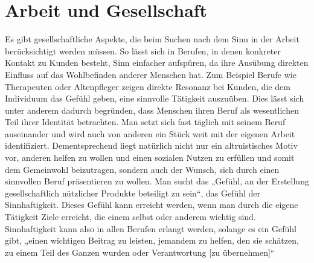 \section{Arbeit und Gesellschaft}
Es gibt gesellschaftliche Aspekte, die beim Suchen nach dem Sinn in der Arbeit berücksichtigt werden müssen. So lässt sich in Berufen, in denen konkreter Kontakt zu Kunden besteht, Sinn einfacher aufspüren, da ihre Ausübung direkten Einfluss auf das Wohlbefinden anderer Menschen hat. Zum Beispiel Berufe wie Therapeuten oder Altenpfleger zeigen direkte Resonanz bei Kunden, die dem Individuum das Gefühl geben, eine sinnvolle Tätigkeit auszuüben\cite[S.192-193]{Voswinkel.2018}. Dies lässt sich unter anderem dadurch begründen, dass Menschen ihren Beruf als wesentlichen Teil ihrer Identität betrachten. Man setzt sich fast täglich mit seinem Beruf auseinander und wird auch von anderen ein Stück weit mit der eigenen Arbeit identifiziert\cite[S.193]{Voswinkel.2018}. Dementsprechend liegt natürlich nicht nur ein altruistisches Motiv vor, anderen helfen zu wollen und einen sozialen Nutzen zu erfüllen und somit dem Gemeinwohl beizutragen\cite[S.193]{Voswinkel.2018}, sondern auch der Wunsch, sich durch einen sinnvollen Beruf präsentieren zu wollen. Man sucht das „Gefühl, an der Erstellung gesellschaftlich nützlicher Produkte beteiligt zu sein“\cite[S.193]{Voswinkel.2018}, das Gefühl der Sinnhaftigkeit. Dieses Gefühl kann erreicht werden, wenn man durch die eigene Tätigkeit Ziele erreicht, die einem selbst oder anderem wichtig sind. Sinnhaftigkeit kann also in allen Berufen erlangt werden, solange es ein Gefühl gibt, „einen wichtigen Beitrag zu leisten, jemandem zu helfen, den sie schätzen, zu einem Teil des Ganzen wurden oder Verantwortung [zu übernehmen]“ \cite[S.205-206]{FluterHoffmann.2018}
